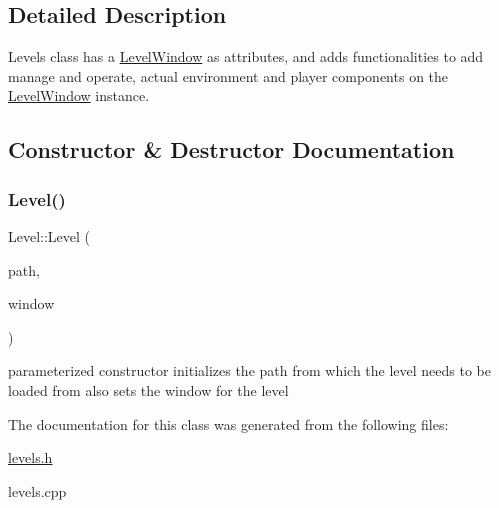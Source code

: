 \subsection{Detailed Description}
Levels class has a \hyperlink{class_level_window}{Level\+Window} as attributes, and adds functionalities to add manage and operate, actual environment and player components on the \hyperlink{class_level_window}{Level\+Window} instance. 

\subsection{Constructor \& Destructor Documentation}
\hypertarget{class_level_aba4f031f3752773a8a04bf58997776b9}{}\label{class_level_aba4f031f3752773a8a04bf58997776b9} 
\subsubsection{\texorpdfstring{Level()}{Level()}}
{\footnotesize\ttfamily Level\+::\+Level (\begin{DoxyParamCaption}\item[{std\+::string}]{path,  }\item[{\hyperlink{class_level_window}{Level\+Window} $\ast$}]{window }\end{DoxyParamCaption})}

parameterized constructor initializes the path from which the level needs to be loaded from also sets the window for the level 

The documentation for this class was generated from the following files\+:\begin{DoxyCompactItemize}
\item 
\hyperlink{levels_8h}{levels.\+h}\item 
levels.\+cpp\end{DoxyCompactItemize}
